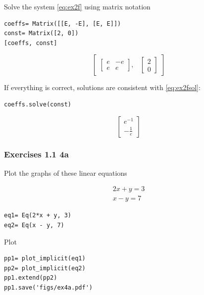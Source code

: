 \documentclass[a4paper]{article}
\begin{document}
Solve the system \ref{eq:ex2f} using matrix notation

\begin{verbatim}
coeffs= Matrix([[E, -E], [E, E]])
const= Matrix([2, 0])
[coeffs, const]
\end{verbatim}

\begin{equation}\label{eq:}
\begin{bmatrix}\left[\begin{matrix}e & - e\\e & e\end{matrix}\right], & \left[\begin{matrix}2\\0\end{matrix}\right]\end{bmatrix}
\end{equation}

If everything is correct, solutions are consistent with \ref{eq:ex2fsol}:

\begin{verbatim}
coeffs.solve(const)
\end{verbatim}

\begin{equation}
\left[\begin{matrix}e^{-1}\\- \frac{1}{e}\end{matrix}\right]
\end{equation}

\subsubsection{Exercises 1.1 4a}
Plot the graphs of these linear equations

\begin{equation}
\begin{matrix}2 x + y = 3\\x - y = 7\end{matrix}
\end{equation}

\begin{verbatim}
eq1= Eq(2*x + y, 3)
eq2= Eq(x - y, 7)
\end{verbatim}

Plot

\begin{verbatim}
pp1= plot_implicit(eq1)
pp2= plot_implicit(eq2)
pp1.extend(pp2)
pp1.save('figs/ex4a.pdf')
\end{verbatim}
\end{document}
